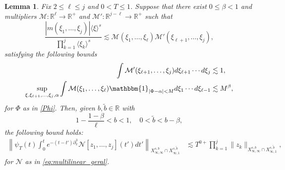 \documentclass[%
11pt,  reqno]{amsart}
\newcommand{\jap}[1]{\langle #1 \rangle}
\newcommand{\5}{\textup{V}}
\newcommand{\les}{\lesssim}
\newcommand{\wt}{\widetilde}
\newtheorem{lemma}[theorem]{Lemma}
\theoremstyle{remark}
\newcommand{\R}{\mathbb{R}}
\renewcommand{\l}{\ell}
\numberwithin{equation}{section}
\numberwithin{theorem}{section}
\newcommand{\Ncal}{\mathcal{N}}
\begin{document}
		\begin{lemma}\label{lem:reduction_fre_kge3}
			Fix $2\le \ell\le j$ and $0<T \le 1$. Suppose that there exist $0\le \beta<1$ and multipliers $\mathcal{M}:\R^\l \to \R^+$ and $\mathcal{M}':\R^{j-\ell}\to \R^+$ such that
			\begin{equation}
				\frac{|m(\xi_1, \ldots, \xi_j)|\jap{\xi}^s}{\prod_{k=1}^j\jap{\xi_k}^s} \lesssim \mathcal{M}(\xi_1,\dots, \xi_{\l})\mathcal{M}'(\xi_{\ell+1},\dots, \xi_{{j}}),
			\end{equation}
            satisfying the following bounds
            \begin{align}
                \int \mathcal{M}'(\xi_{\ell+1},\ldots, \xi_{{j}}) d\xi_{\ell+1}\cdots d\xi_j
                &
                \les 1
                , 
                \\
                \sup_{\xi, \xi_{\ell+1},\dots , \xi_{j},\alpha} \int \mathcal{M}(\xi_1,\dots,\xi_\l) \mathbbm{1}_{|\Phi-\alpha|<M} d\xi_1\cdots d\xi_{\ell-1} &
                \lesssim  
                M^\beta
                 \label{fre_kge3}, 
            \end{align}
            for $\Phi$ as in \eqref{Phi}. 
            Then, given $b,\wt b\in \R$ with
            $$
            1-\frac{1-\beta}{\ell}<b<1,\quad 0<\wt{b}<b-\beta, 
            $$
            the following  bound holds:
			\begin{align}\label{frek}
				\left\|\psi_T (t)\int_0^te^{-(t-t')\partial_x^3}\Ncal[z_1,\dots, z_j](t')dt' \right\|_{X^{s,b}_{\infty, \infty}\cap X^{s,\wt{b}}_{\infty, 1}} & \les T^{0+}\prod_{k=1}^j\|z_k\|_{X^{s,b}_{\infty, \infty} \cap X^{s,\wt{b}}_{\infty,1}}
                , 
			\end{align}
			for $\Ncal$ as in \eqref{eq:multilinear_geral}.
		\end{lemma}

        
       
		
		
\end{document}
